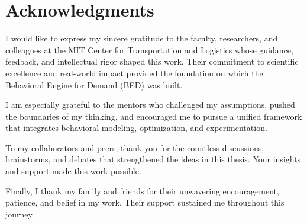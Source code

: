 \chapter*{Acknowledgments}

I would like to express my sincere gratitude to the faculty, researchers, and
colleagues at the MIT Center for Transportation and Logistics whose guidance,
feedback, and intellectual rigor shaped this work. Their commitment to
scientific excellence and real-world impact provided the foundation on which the
Behavioral Engine for Demand (BED) was built.

I am especially grateful to the mentors who challenged my assumptions, pushed
the boundaries of my thinking, and encouraged me to pursue a unified framework
that integrates behavioral modeling, optimization, and experimentation.

To my collaborators and peers, thank you for the countless discussions,
brainstorms, and debates that strengthened the ideas in this thesis. Your
insights and support made this work possible.

Finally, I thank my family and friends for their unwavering encouragement,
patience, and belief in my work. Their support sustained me throughout this
journey.
